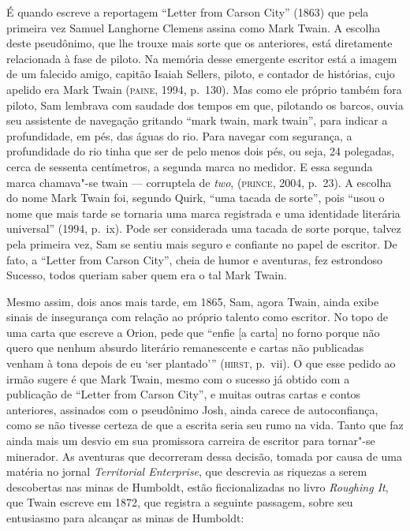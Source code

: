 É quando escreve a reportagem “Letter from Carson City” (1863) que pela
primeira vez Samuel Langhorne Clemens assina como Mark Twain. A escolha
deste pseudônimo, que lhe trouxe mais sorte que os anteriores,
está diretamente relacionada à fase de piloto. Na memória desse emergente
escritor está a imagem de um falecido amigo, capitão Isaiah Sellers,
piloto, e contador de histórias, cujo apelido era Mark Twain (\textsc{paine}, 1994,
p.~130). Mas como ele próprio também fora piloto, Sam lembrava com
saudade dos tempos em que, pilotando os barcos, ouvia seu
assistente de navegação gritando ``mark twain, mark
twain'', para indicar a profundidade, em pés, das águas do
rio. Para navegar com segurança, a profundidade do rio tinha que ser de
pelo menos dois pés, ou seja, 24 polegadas, cerca de sessenta centímetros, a segunda marca no
medidor. E essa segunda marca chamava"-se twain --- corruptela de \textit{two},
(\textsc{prince}, 2004, p.~23). A escolha do nome Mark Twain foi, segundo Quirk,
“uma tacada de sorte”, pois “usou o nome que mais tarde se tornaria uma
marca registrada e uma identidade literária universal” (1994, p.~ix). Pode
ser considerada uma tacada de sorte porque, talvez pela primeira vez, Sam
se sentiu mais seguro e confiante no papel de escritor. De fato, a
“Letter from Carson City”, cheia de humor e aventuras, fez estrondoso
Sucesso, todos queriam saber quem era o tal Mark Twain.

Mesmo assim, dois anos mais tarde, em 1865, Sam, agora Twain, ainda
exibe sinais de insegurança com relação ao próprio talento como
escritor. No topo de uma carta que escreve a Orion, pede que “enfie [a
carta] no forno porque não quero que nenhum absurdo literário remanescente
e cartas não publicadas venham à tona depois de eu ‘ser plantado’” (\textsc{hirst}, p.~vii).
O que esse pedido ao irmão sugere é que Mark Twain, mesmo com o
sucesso já obtido com a publicação de “Letter from Carson City”, e muitas
outras cartas e contos anteriores, assinados com o pseudônimo Josh, ainda
carece de autoconfiança, como se não tivesse certeza de que a escrita
seria seu rumo na vida. Tanto que faz ainda mais um desvio em
sua promissora carreira de escritor para tornar"-se minerador. As aventuras
que decorreram dessa decisão, tomada por causa de uma matéria no jornal
\textit{Territorial Enterprise}, que descrevia as riquezas a serem descobertas nas
minas de Humboldt, estão ficcionalizadas no livro \textit{Roughing It}, que
Twain escreve em 1872, que registra a seguinte passagem, sobre seu entusiasmo para
alcançar as minas de Humboldt: 

